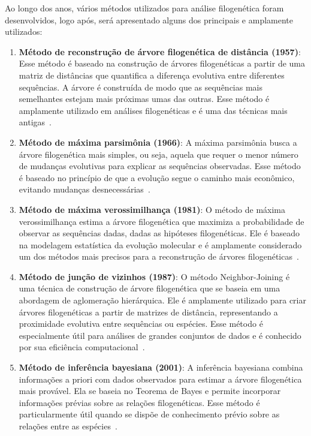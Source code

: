 Ao longo dos anos, vários métodos utilizados para análise filogenética foram desenvolvidos, logo após, será apresentado alguns dos principais e amplamente utilizados:

\begin{enumerate}
  \item \textbf{Método de reconstrução de árvore filogenética de distância (1957)}: Esse método é baseado na construção de árvores filogenéticas a partir de uma matriz de distâncias que quantifica a diferença evolutiva entre diferentes sequências. A árvore é construída de modo que as sequências mais semelhantes estejam mais próximas umas das outras. Esse método é amplamente utilizado em análises filogenéticas e é uma das técnicas mais antigas~\cite{sokal_statistical_method_1958}.
  \item \textbf{Método de máxima parsimônia (1966)}: A máxima parsimônia busca a árvore filogenética mais simples, ou seja, aquela que requer o menor número de mudanças evolutivas para explicar as sequências observadas. Esse método é baseado no princípio de que a evolução segue o caminho mais econômico, evitando mudanças desnecessárias~\cite{fitch_toward_definition_1971}.
  \item \textbf{Método de máxima verossimilhança (1981)}: O método de máxima verossimilhança estima a árvore filogenética que maximiza a probabilidade de observar as sequências dadas, dadas as hipóteses filogenéticas. Ele é baseado na modelagem estatística da evolução molecular e é amplamente considerado um dos métodos mais precisos para a reconstrução de árvores filogenéticas~\cite{felsenstein_evolutionary_tree_1981}.
  \item \textbf{Método de junção de vizinhos (1987)}: O método Neighbor-Joining é uma técnica de construção de árvore filogenética que se baseia em uma abordagem de aglomeração hierárquica. Ele é amplamente utilizado para criar árvores filogenéticas a partir de matrizes de distância, representando a proximidade evolutiva entre sequências ou espécies. Esse método é especialmente útil para análises de grandes conjuntos de dados e é conhecido por sua eficiência computacional~\cite{saitou_neighbor_1987}. %
  \item \textbf{Método de inferência bayesiana (2001)}: A inferência bayesiana combina informações a priori com dados observados para estimar a árvore filogenética mais provável. Ela se baseia no Teorema de Bayes e permite incorporar informações prévias sobre as relações filogenéticas. Esse método é particularmente útil quando se dispõe de conhecimento prévio sobre as relações entre as espécies~\cite{huelsenbeck_bayesian_inference_2001}.

\end{enumerate}
